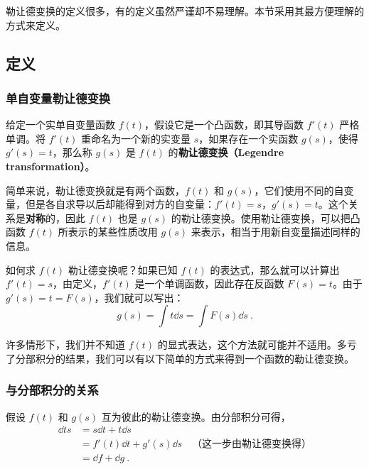 

勒让德变换的定义很多，有的定义虽然严谨却不易理解。本节采用其最方便理解的方式来定义。

\subsection{定义}

\subsubsection{单自变量勒让德变换}
\begin{definition}{}
给定一个实单自变量函数 $f(t)$，假设它是一个凸函数，即其导函数 $f'(t)$ 严格单调。将 $f'(t)$ 重命名为一个新的实变量 $s$，如果存在一个实函数 $g(s)$，使得 $g'(s)=t$，那么称 $g(s)$ 是 $f(t)$ 的\textbf{勒让德变换（Legendre transformation）}。
\end{definition}

简单来说，勒让德变换就是有两个函数，$f(t)$ 和 $g(s)$，它们使用不同的自变量，但是各自求导以后却能得到对方的自变量：$f'(t)=s$，$g'(s)=t$。这个关系是\textbf{对称}的，因此 $f(t)$ 也是 $g(s)$ 的勒让德变换。使用勒让德变换，可以把凸函数 $f(t)$ 所表示的某些性质改用 $g(s)$ 来表示，相当于用新自变量描述同样的信息。

如何求 $f(t)$ 勒让德变换呢？如果已知 $f(t)$ 的表达式，那么就可以计算出 $f'(t)=s$，由定义，$f'(t)$ 是一个单调函数，因此存在反函数 $F(s)=t$。由于 $g'(s)=t=F(s)$，我们就可以写出：
\begin{equation}
g(s)=\int t \dd{s}=\int F(s) \dd{s}~.
\end{equation}

许多情形下，我们并不知道 $f(t)$ 的显式表达，这个方法就可能并不适用。多亏了分部积分的结果，我们可以有以下简单的方式来得到一个函数的勒让德变换。


\subsubsection{与分部积分的关系}

假设 $f(t)$ 和 $g(s)$ 互为彼此的勒让德变换。由分部积分可得，
\begin{equation}
\begin{aligned}
\dd{ts}&=s\dd{t}+t\dd{s}\\&=f'(t)\dd{t}+g'(s)\dd{s}\quad\text{（这一步由勒让德变换得）}\\&=\dd{f}+\dd{g}~.
\end{aligned}
\end{equation}

